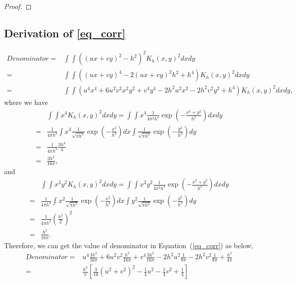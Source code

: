 \documentclass{article}
\begin{document}
\begin{appendices}
\begin{proof}
	\end{proof}
	\subsection{Derivation of \eqref{eq_corr}}
	\label{Derive_2nd_corr}
	\begin{equation*}
		\begin{aligned}
			Denominator=&\int\int((ux+vy)^2-h^2)^2K_{h}(x,y)^2dxdy\\
			=&\int\int((ux+vy)^4-2(ux+vy)^2h^2+h^4)K_{h}(x,y)^2dxdy\\
			=&\int\int(u^4x^4+6u^2v^2x^2y^2+v^4y^4-2h^2u^2x^2-2h^2v^2y^2+h^4)K_{h}(x,y)^2dxdy,
		\end{aligned}
	\end{equation*}
	where we have
	\begin{equation*}
		\begin{aligned}
			&\int\int x^4K_{h}(x,y)^2dxdy=\int\int x^4\frac{1}{4\pi^2h^4}\exp(-\frac{x^2+y^2}{h^2})dxdy\\
			=&\frac{1}{4\pi h^2}\int x^4\frac{1}{\sqrt{\pi h^2}}\exp(-\frac{x^2}{h^2})dx\int \frac{1}{\sqrt{\pi h^2}}\exp(-\frac{y^2}{h^2})dy\\
			=&\frac{1}{4\pi h^2}\frac{3h^4}{4}\\
			=&\frac{3h^2}{16\pi},
		\end{aligned}
	\end{equation*}
	and
	\begin{equation*}
		\begin{aligned}
			&\int\int x^2y^2K_{h}(x,y)^2dxdy=\int\int x^2y^2\frac{1}{4\pi^2h^4}\exp(-\frac{x^2+y^2}{h^2})dxdy\\
			=&\frac{1}{4\pi h^2}\int x^2\frac{1}{\sqrt{\pi h^2}}\exp(-\frac{x^2}{h^2})dx\int y^2\frac{1}{\sqrt{\pi h^2}}\exp(-\frac{y^2}{h^2})dy\\
			=&\frac{1}{4\pi h^2}(\frac{h^2}{2})^2\\
			=&\frac{h^2}{16\pi}.
		\end{aligned}
	\end{equation*}
	Therefore, we can get the value of denominator in Equation~(\ref{eq_corr}) as below,
	\begin{equation}
		\label{eq_denom}
		\begin{aligned}
			Denominator=&u^4\frac{3h^2}{16\pi}+6u^2v^2\frac{h^2}{16\pi}+v^4\frac{3h^2}{16\pi}-2h^2u^2\frac{1}{8\pi}-2h^2v^2\frac{1}{8\pi}+\frac{h^2}{4\pi}\\
			=&\frac{h^2}{\pi}[\frac{3}{16}(u^2+v^2)^2-\frac{1}{4}u^2-\frac{1}{4}v^2+\frac{1}{4}]\\

\end{aligned}
\end{equation}
\end{appendices}
\end{document}

